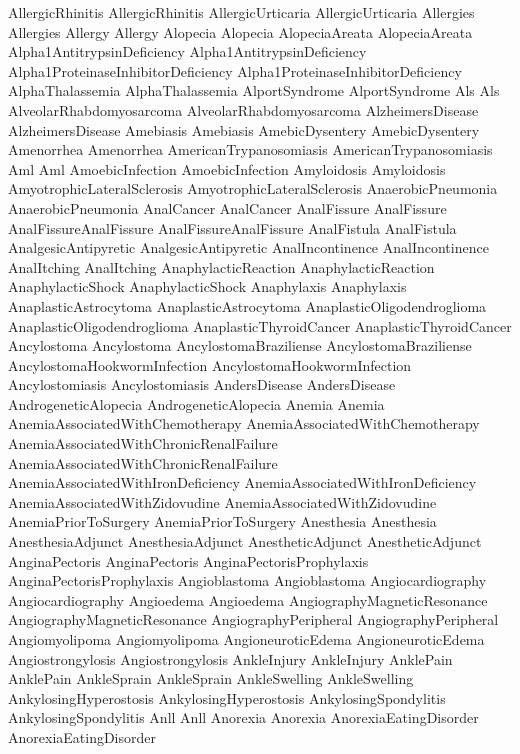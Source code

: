 AllergicRhinitis
 AllergicRhinitis
 AllergicUrticaria
 AllergicUrticaria
 Allergies
 Allergies
 Allergy
 Allergy
 Alopecia
 Alopecia
 AlopeciaAreata
 AlopeciaAreata
 Alpha1AntitrypsinDeficiency
 Alpha1AntitrypsinDeficiency
 Alpha1ProteinaseInhibitorDeficiency
 Alpha1ProteinaseInhibitorDeficiency
 AlphaThalassemia
 AlphaThalassemia
 AlportSyndrome
 AlportSyndrome
 Als
 Als
 AlveolarRhabdomyosarcoma
 AlveolarRhabdomyosarcoma
 AlzheimersDisease
 AlzheimersDisease
 Amebiasis
 Amebiasis
 AmebicDysentery
 AmebicDysentery
 Amenorrhea
 Amenorrhea
 AmericanTrypanosomiasis
 AmericanTrypanosomiasis
 Aml
 Aml
 AmoebicInfection
 AmoebicInfection
 Amyloidosis
 Amyloidosis
 AmyotrophicLateralSclerosis
 AmyotrophicLateralSclerosis
 AnaerobicPneumonia
 AnaerobicPneumonia
 AnalCancer
 AnalCancer
 AnalFissure
 AnalFissure
 AnalFissureAnalFissure
 AnalFissureAnalFissure
 AnalFistula
 AnalFistula
 AnalgesicAntipyretic
 AnalgesicAntipyretic
 AnalIncontinence
 AnalIncontinence
 AnalItching
 AnalItching
 AnaphylacticReaction
 AnaphylacticReaction
 AnaphylacticShock
 AnaphylacticShock
 Anaphylaxis
 Anaphylaxis
 AnaplasticAstrocytoma
 AnaplasticAstrocytoma
 AnaplasticOligodendroglioma
 AnaplasticOligodendroglioma
 AnaplasticThyroidCancer
 AnaplasticThyroidCancer
 Ancylostoma
 Ancylostoma
 AncylostomaBraziliense
 AncylostomaBraziliense
 AncylostomaHookwormInfection
 AncylostomaHookwormInfection
 Ancylostomiasis
 Ancylostomiasis
 AndersDisease
 AndersDisease
 AndrogeneticAlopecia
 AndrogeneticAlopecia
 Anemia
 Anemia
 AnemiaAssociatedWithChemotherapy
 AnemiaAssociatedWithChemotherapy
 AnemiaAssociatedWithChronicRenalFailure
 AnemiaAssociatedWithChronicRenalFailure
 AnemiaAssociatedWithIronDeficiency
 AnemiaAssociatedWithIronDeficiency
 AnemiaAssociatedWithZidovudine
 AnemiaAssociatedWithZidovudine
 AnemiaPriorToSurgery
 AnemiaPriorToSurgery
 Anesthesia
 Anesthesia
 AnesthesiaAdjunct
 AnesthesiaAdjunct
 AnestheticAdjunct
 AnestheticAdjunct
 AnginaPectoris
 AnginaPectoris
 AnginaPectorisProphylaxis
 AnginaPectorisProphylaxis
 Angioblastoma
 Angioblastoma
 Angiocardiography
 Angiocardiography
 Angioedema
 Angioedema
 AngiographyMagneticResonance
 AngiographyMagneticResonance
 AngiographyPeripheral
 AngiographyPeripheral
 Angiomyolipoma
 Angiomyolipoma
 AngioneuroticEdema
 AngioneuroticEdema
 Angiostrongylosis
 Angiostrongylosis
 AnkleInjury
 AnkleInjury
 AnklePain
 AnklePain
 AnkleSprain
 AnkleSprain
 AnkleSwelling
 AnkleSwelling
 AnkylosingHyperostosis
 AnkylosingHyperostosis
 AnkylosingSpondylitis
 AnkylosingSpondylitis
 Anll
 Anll
 Anorexia
 Anorexia
 AnorexiaEatingDisorder
 AnorexiaEatingDisorder
